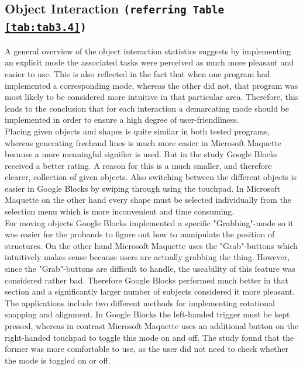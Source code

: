 \documentclass{report}
\begin{document}
		\subsection[Object Interaction]{Object Interaction \small{\texttt{(referring Table \ref{tab:tab3.4})}}}
		\startsubsection
			A general overview of the object interaction statistics suggests by implementing an explicit mode the associated tasks were perceived as much more pleasant and easier to use. This is also reflected in the fact that when one program had implemented a corresponding mode, whereas the other did not, that program was most likely to be considered more intuitive in that particular area. Therefore, this leads to the conclusion that for each interaction a demarcating mode should be implemented in order to ensure a high degree of user-friendliness. \\
			Placing given objects and shapes is quite similar in both tested programs, whereas generating freehand lines is much more easier in Microsoft Maquette because a more meaningful signifier is used. But in the study Google Blocks received a better rating. A reason for this is a much smaller, and therefore clearer, collection of given objects. Also switching between the different objects is easier in Google Blocks by swiping through using the touchpad. In Microsoft Maquette on the other hand every shape must be selected individually from the selection menu which is more inconvenient and time consuming. \\
			For moving objects Google Blocks implemented a specific "Grabbing"-mode so it was easier for the probands to figure out how to manipulate the position of structures. On the other hand Microsoft Maquette uses the "Grab"-buttons which intuitively makes sense because users are actually grabbing the thing. However, since the "Grab"-buttons are difficult to handle, the useability of this feature was considered rather bad. Therefore Google Blocks performed much better in that section and a significantly larger number of subjects considered it more pleasant. \\
			The applications include two different methods for implementing rotational snapping and alignment. In Google Blocks the left-handed trigger must be kept pressed, whereas in contrast Microsoft Maquette uses an additional button on the right-handed touchpad to toggle this mode on and off. The study found that the former was more comfortable to use, as the user did not need to check whether the mode is toggled on or off. \\
\end{document}
